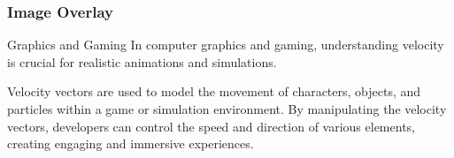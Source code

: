 \documentclass{beamer}
\begin{document}
\begin{frame}[plain]
        \frametitle{Image Overlay}
    
\end{frame}


\begin{frame}[t]{Graphics and Gaming}
\vspace{15pt}
In computer graphics and gaming, understanding velocity is crucial for realistic animations and simulations.

Velocity vectors are used to model the movement of characters, objects, and particles within a game or simulation environment. By manipulating the velocity vectors, developers can control the speed and direction of various elements, creating engaging and immersive experiences.
\end{frame}
\end{document}
